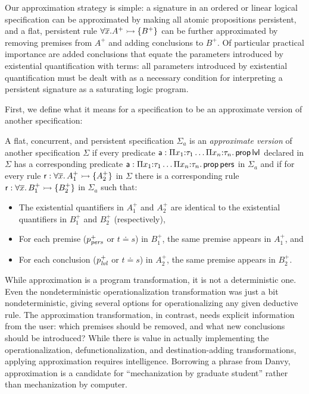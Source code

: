 Our approximation strategy is simple: a signature in an ordered or
linear logical specification can be approximated by making all atomic
propositions persistent, and a flat, persistent rule $\forall
\overline{x}. A^+ \rightarrowtail \{ B^+ \}$ can be further approximated by
removing premises from $A^+$ and adding conclusions to $B^+$. Of
particular practical importance are added conclusions that equate the
parameters introduced by existential quantification with terms: all
parameters introduced by existential quantification must be dealt with
as a necessary condition for interpreting a persistent signature as a
saturating logic program.

First, we define what it means for a specification to be an approximate
version of another specification:

\bigskip
\begin{definition}\label{def:approxversion}
  A flat, concurrent, and persistent specification $\Sigma_a$ is an
  {\em approximate version} of another specification $\Sigma$ if every
  predicate ${\sf a} : \Pi x_1{:}\tau_1 \ldots \Pi x_n{:}\tau_n.\,
  {\sf prop}\,{\sf lvl}$ declared in $\Sigma$ has a corresponding
  predicate ${\sf a} : \Pi x_1{:}\tau_1 \ldots \Pi x_n{:}\tau_n.\,
  {\sf prop}\,{\sf pers}$ in $\Sigma_a$ and if for every rule ${\sf
    r} : \forall \overline{x}.\,A_1^+ \rightarrowtail \{ A_2^+ \}$ in $\Sigma$ there
  is a corresponding rule ${\sf r} : \forall \overline{x}.\,B_1^+ \rightarrowtail
  \{ B_2^+ \}$ in $\Sigma_a$ such that:
  \begin{itemize}
  \item The existential quantifiers in $A_1^+$ and $A_2^+$ are
    identical to the existential quantifiers in $B_1^+$ and $B_2^+$
    (respectively),
  \item For each premise ($p^+_{\it pers}$ or $t \doteq s$) in $B^+_1$,
    the same premise appears in $A^+_1$, and 
  \item For each conclusion ($p^+_{\it lvl}$ or $t
    \doteq s$) in $A^+_2$, the same premise appears in $B^+_2$.
  \end{itemize}
\end{definition}
\bigskip

\noindent
While approximation is a program transformation, it is not a
deterministic one. Even the nondeterministic operationalization
transformation was just a bit nondeterministic, giving several options
for operationalizing any given deductive rule. The approximation
transformation, in contrast, needs explicit information from the user:
which premises should be removed, and what new conclusions should be
introduced? While there is value in actually implementing the
operationalization, defunctionalization, and destination-adding
transformations, applying approximation requires
intelligence. Borrowing a phrase from Danvy, approximation is a
candidate for ``mechanization by graduate student'' rather than
mechanization by computer.

